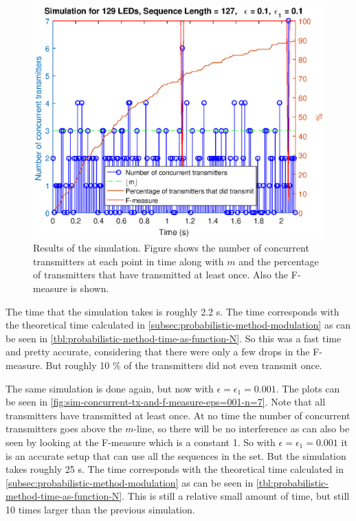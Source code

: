 \begin{figure}[tbp]
	\centering
	\includegraphics[width=\textwidth]{chapters/evaluation-chapters/simulation/sim-concurrent-tx-and-f-measure-eps=1-n=7.eps}
	\caption{Results of the simulation. Figure shows the number of concurrent transmitters at each point in time along with $m$ and the percentage of transmitters that have transmitted at least once. Also the F-measure is shown.}
	\label{fig:sim-concurrent-tx-and-f-measure-eps=1-n=7}
\end{figure}









The time that the simulation takes is roughly 2.2 s.
The time corresponds with the theoretical time calculated in \autoref{subsec:probabilistic-method-modulation} as can be seen in \autoref{tbl:probabilistic-method-time-as-function-N}.
So this was a fast time and pretty accurate, considering that there were only a few drops in the F-measure.
But roughly 10 \% of the transmitters did not even transmit once.










The same simulation is done again, but now with $\epsilon = \epsilon_1 = 0.001$.
The plots can be seen in \autoref{fig:sim-concurrent-tx-and-f-measure-eps=001-n=7}.
Note that all transmitters have transmitted at least once.
At no time the number of concurrent transmitters goes above the $m$-line, so there will be no interference as can also be seen by looking at the F-measure which is a constant 1.
So with $\epsilon = \epsilon_1 = 0.001$ it is an accurate setup that can use all the sequences in the set.
But the simulation takes roughly 25 s.
The time corresponds with the theoretical time calculated in \autoref{subsec:probabilistic-method-modulation} as can be seen in \autoref{tbl:probabilistic-method-time-as-function-N}.
This is still a relative small amount of time, but still 10 times larger than the previous simulation.



